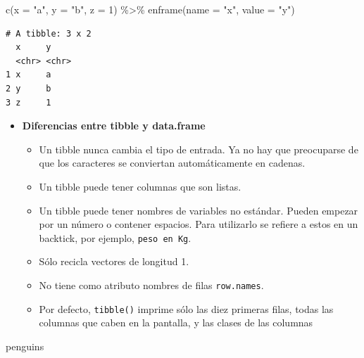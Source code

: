 \documentclass[
  letterpaper,
  DIV=11,
  numbers=noendperiod]{scrreprt}
\newenvironment{Shaded}{\begin{snugshade}}{\end{snugshade}}
\newcommand{\AttributeTok}[1]{\textcolor[rgb]{0.40,0.45,0.13}{#1}}
\newcommand{\DecValTok}[1]{\textcolor[rgb]{0.68,0.00,0.00}{#1}}
\newcommand{\FunctionTok}[1]{\textcolor[rgb]{0.28,0.35,0.67}{#1}}
\newcommand{\NormalTok}[1]{\textcolor[rgb]{0.00,0.23,0.31}{#1}}
\newcommand{\SpecialCharTok}[1]{\textcolor[rgb]{0.37,0.37,0.37}{#1}}
\newcommand{\StringTok}[1]{\textcolor[rgb]{0.13,0.47,0.30}{#1}}
\begin{document}
\begin{Shaded}
\begin{Highlighting}[]
\FunctionTok{c}\NormalTok{(}\AttributeTok{x =} \StringTok{"a"}\NormalTok{, }\AttributeTok{y =} \StringTok{"b"}\NormalTok{, }\AttributeTok{z =} \DecValTok{1}\NormalTok{) }\SpecialCharTok{\%\textgreater{}\%}
  \FunctionTok{enframe}\NormalTok{(}\AttributeTok{name =} \StringTok{"x"}\NormalTok{, }\AttributeTok{value =} \StringTok{"y"}\NormalTok{)}
\end{Highlighting}
\end{Shaded}

\begin{verbatim}
# A tibble: 3 x 2
  x     y    
  <chr> <chr>
1 x     a    
2 y     b    
3 z     1    
\end{verbatim}

\begin{itemize}
\item
  \textbf{Diferencias entre tibble y data.frame}

  \begin{itemize}
  \item
    Un tibble nunca cambia el tipo de entrada. Ya no hay que preocuparse
    de que los caracteres se conviertan automáticamente en cadenas.
  \item
    Un tibble puede tener columnas que son listas.
  \item
    Un tibble puede tener nombres de variables no estándar. Pueden
    empezar por un número o contener espacios. Para utilizarlo se
    refiere a estos en un backtick, por ejemplo, \texttt{peso\ en\ Kg}.
  \item
    Sólo recicla vectores de longitud 1.
  \item
    No tiene como atributo nombres de filas \texttt{row.names}.
  \item
    Por defecto, \texttt{tibble()} imprime sólo las diez primeras filas,
    todas las columnas que caben en la pantalla, y las clases de las
    columnas
  \end{itemize}
\end{itemize}

\begin{Shaded}
\begin{Highlighting}[]
\NormalTok{penguins}
\end{Highlighting}
\end{Shaded}
\end{document}
